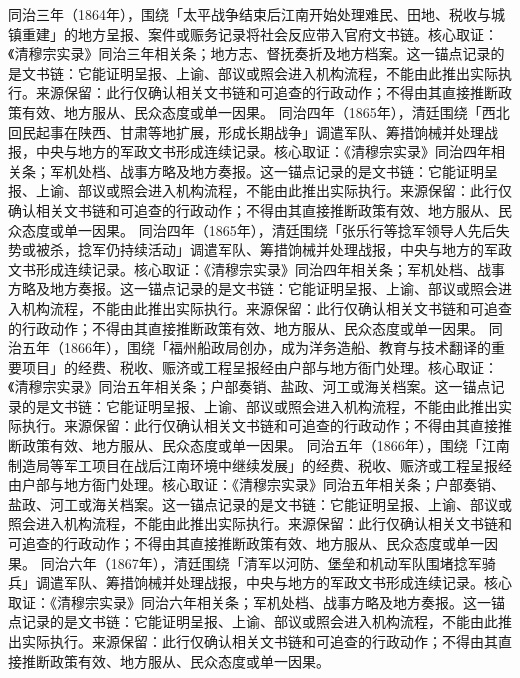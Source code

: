 同治三年（1864年），围绕「太平战争结束后江南开始处理难民、田地、税收与城镇重建」的地方呈报、案件或赈务记录将社会反应带入官府文书链。核心取证：《清穆宗实录》同治三年相关条；地方志、督抚奏折及地方档案。这一锚点记录的是文书链：它能证明呈报、上谕、部议或照会进入机构流程，不能由此推出实际执行。来源保留：此行仅确认相关文书链和可追查的行政动作；不得由其直接推断政策有效、地方服从、民众态度或单一因果。
同治四年（1865年），清廷围绕「西北回民起事在陕西、甘肃等地扩展，形成长期战争」调遣军队、筹措饷械并处理战报，中央与地方的军政文书形成连续记录。核心取证：《清穆宗实录》同治四年相关条；军机处档、战事方略及地方奏报。这一锚点记录的是文书链：它能证明呈报、上谕、部议或照会进入机构流程，不能由此推出实际执行。来源保留：此行仅确认相关文书链和可追查的行政动作；不得由其直接推断政策有效、地方服从、民众态度或单一因果。
同治四年（1865年），清廷围绕「张乐行等捻军领导人先后失势或被杀，捻军仍持续活动」调遣军队、筹措饷械并处理战报，中央与地方的军政文书形成连续记录。核心取证：《清穆宗实录》同治四年相关条；军机处档、战事方略及地方奏报。这一锚点记录的是文书链：它能证明呈报、上谕、部议或照会进入机构流程，不能由此推出实际执行。来源保留：此行仅确认相关文书链和可追查的行政动作；不得由其直接推断政策有效、地方服从、民众态度或单一因果。
同治五年（1866年），围绕「福州船政局创办，成为洋务造船、教育与技术翻译的重要项目」的经费、税收、赈济或工程呈报经由户部与地方衙门处理。核心取证：《清穆宗实录》同治五年相关条；户部奏销、盐政、河工或海关档案。这一锚点记录的是文书链：它能证明呈报、上谕、部议或照会进入机构流程，不能由此推出实际执行。来源保留：此行仅确认相关文书链和可追查的行政动作；不得由其直接推断政策有效、地方服从、民众态度或单一因果。
同治五年（1866年），围绕「江南制造局等军工项目在战后江南环境中继续发展」的经费、税收、赈济或工程呈报经由户部与地方衙门处理。核心取证：《清穆宗实录》同治五年相关条；户部奏销、盐政、河工或海关档案。这一锚点记录的是文书链：它能证明呈报、上谕、部议或照会进入机构流程，不能由此推出实际执行。来源保留：此行仅确认相关文书链和可追查的行政动作；不得由其直接推断政策有效、地方服从、民众态度或单一因果。
同治六年（1867年），清廷围绕「清军以河防、堡垒和机动军队围堵捻军骑兵」调遣军队、筹措饷械并处理战报，中央与地方的军政文书形成连续记录。核心取证：《清穆宗实录》同治六年相关条；军机处档、战事方略及地方奏报。这一锚点记录的是文书链：它能证明呈报、上谕、部议或照会进入机构流程，不能由此推出实际执行。来源保留：此行仅确认相关文书链和可追查的行政动作；不得由其直接推断政策有效、地方服从、民众态度或单一因果。
